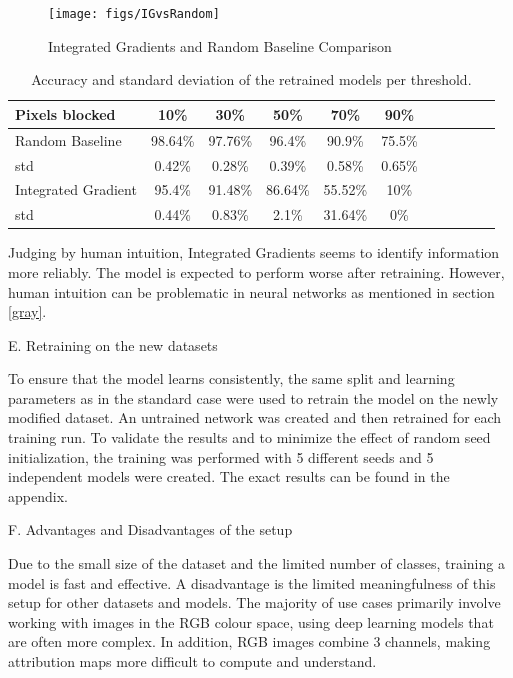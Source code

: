 \begin{figure}[H]
	\centering
	\texttt{[image: figs/IGvsRandom]}
	\caption{Integrated Gradients and Random Baseline Comparison}
	\label{fig:IGvsRandom}
\end{figure}

\begin{table}[H]
	\centering
	\begin{tabular}{|l|c|c|c|c|c|c|c|c|c|c|}
		\hline
		Pixels blocked & 10\% & 30\% & 50\% & 70\% & 90\% \\
		\hline
		Random Baseline & 98.64\% & 97.76\% & 96.4\% & 90.9\% & 75.5\% \\
		std & 0.42\% & 0.28\% & 0.39\% & 0.58\% & 0.65\%  \\
		\hline
		Integrated Gradient& 95.4\% & 91.48\% & 86.64\% & 55.52\% & 10\%  \\
		std & 0.44\% & 0.83\% & 2.1\% & 31.64\% & 0\%  \\
		\hline
	\end{tabular} \newline
	\caption{Accuracy and standard deviation of the retrained models per threshold.}
	\label{tab:sclass_precision_ig}
\end{table}


Judging by human intuition, Integrated Gradients \cite{sundararajan2017axiomatic} seems to identify information more reliably. The model is expected to perform worse after retraining. However, human intuition can be problematic in neural networks as mentioned in section \ref{gray}.

E. Retraining on the new datasets

To ensure that the model learns consistently, the same split and learning parameters as in the standard case were used to retrain the model on the newly modified dataset. An untrained network was created and then retrained for each training run. To validate the results and to minimize the effect of random seed initialization, the training was performed with 5 different seeds and 5 independent models were created. The exact results can be found in the appendix.

F. Advantages and Disadvantages of the setup

Due to the small size of the dataset and the limited number of classes, training a model is fast and effective. A disadvantage is the limited meaningfulness of this setup for other datasets and models. The majority of use cases primarily involve working with images in the RGB colour space, using deep learning models that are often more complex. In addition, RGB images combine 3 channels, making attribution maps more difficult to compute and understand.

